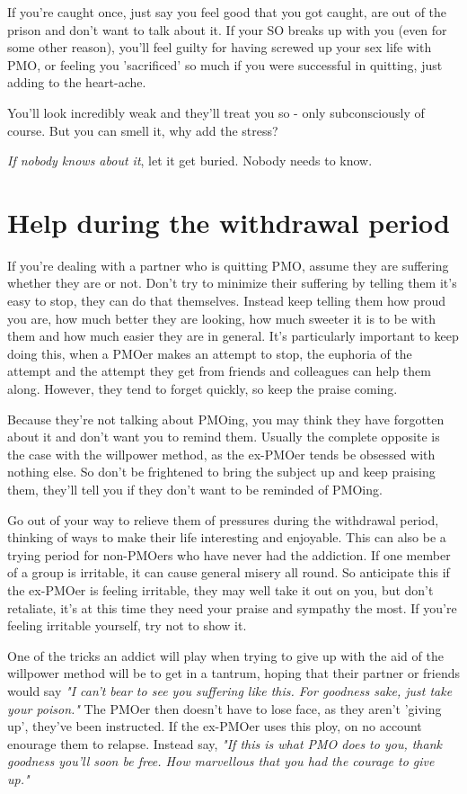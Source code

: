 \documentclass[easypeasy.tex]{subfiles}
\begin{document}
If you're caught once, just say you feel good that you got caught, are out of the prison and don't want to talk about it. If your SO breaks up with you (even for some other reason), you'll feel guilty for having screwed up your sex life with PMO, or feeling you 'sacrificed' so much if you were successful in quitting, just adding to the heart-ache.

You'll look incredibly weak and they'll treat you so - only subconsciously of course. But you can smell it, why add the stress?

\textit{If nobody knows about it}, let it get buried. Nobody needs to know.

\section{Help during the withdrawal period}

If you're dealing with a partner who is quitting PMO, assume they are suffering whether they are or not. Don't try to minimize their suffering by telling them it's easy to stop, they can do that themselves. Instead keep telling them how proud you are, how much better they are looking, how much sweeter it is to be with them and how much easier they are in general. It's particularly important to keep doing this, when a PMOer makes an attempt to stop, the euphoria of the attempt and the attempt they get from friends and colleagues can help them along. However, they tend to forget quickly, so keep the praise coming.

Because they're not talking about PMOing, you may think they have forgotten about it and don't want you to remind them. Usually the complete opposite is the case with the willpower method, as the ex-PMOer tends be obsessed with nothing else. So don't be frightened to bring the subject up and keep praising them, they'll tell you if they don't want to be reminded of PMOing.

Go out of your way to relieve them of pressures during the withdrawal period, thinking of ways to make their life interesting and enjoyable. This can also be a trying period for non-PMOers who have never had the addiction. If one member of a group is irritable, it can cause general misery all round. So anticipate this if the ex-PMOer is feeling irritable, they may well take it out on you, but don't retaliate, it's at this time they need your praise and sympathy the most. If you're feeling irritable yourself, try not to show it.

One of the tricks an addict will play when trying to give up with the aid of the willpower method will be to get in a tantrum, hoping that their partner or friends would say \textit{"I can't bear to see you suffering like this. For goodness sake, just take your poison."} The PMOer then doesn't have to lose face, as they aren't 'giving up', they've been instructed. If the ex-PMOer uses this ploy, on no account enourage them to relapse. Instead say, \textit{"If this is what PMO does to you, thank goodness you'll soon be free. How marvellous that you had the courage to give up."}
\end{document}
